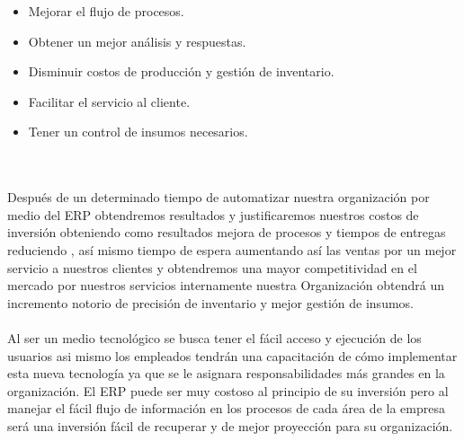 \begin{itemize}
	\item Mejorar el flujo de procesos. 
	\item	Obtener un mejor an\'alisis y respuestas.
	\item Disminuir costos de producci\'on y gesti\'on de inventario.
	\item Facilitar el servicio al cliente.
	\item Tener un control de insumos necesarios.
\end{itemize}
\\%
\\%
Despu\'es de un determinado tiempo de automatizar nuestra organizaci\'on por medio del ERP obtendremos resultados y justificaremos nuestros costos de inversi\'on obteniendo como resultados  mejora de procesos y tiempos de entregas reduciendo , as\'i mismo tiempo de espera  aumentando as\'i las ventas por un mejor servicio a nuestros clientes y obtendremos una mayor competitividad  en el mercado por nuestros servicios  internamente nuestra Organizaci\'on obtendr\'a un incremento notorio de precisi\'on de inventario y mejor gesti\'on de insumos.
\\%
\\%
Al ser un medio tecnol\'ogico se busca tener el f\'acil acceso y ejecuci\'on de los usuarios asi mismo los empleados tendr\'an una capacitaci\'on de c\'omo implementar esta nueva tecnolog\'ia ya que se le asignara responsabilidades m\'as grandes en la organizaci\'on. El ERP puede ser muy costoso al principio de su inversi\'on pero al manejar el f\'acil flujo de informaci\'on en los procesos de cada \'area de la empresa ser\'a una inversi\'on f\'acil de recuperar y de mejor proyecci\'on para su organizaci\'on.
%

